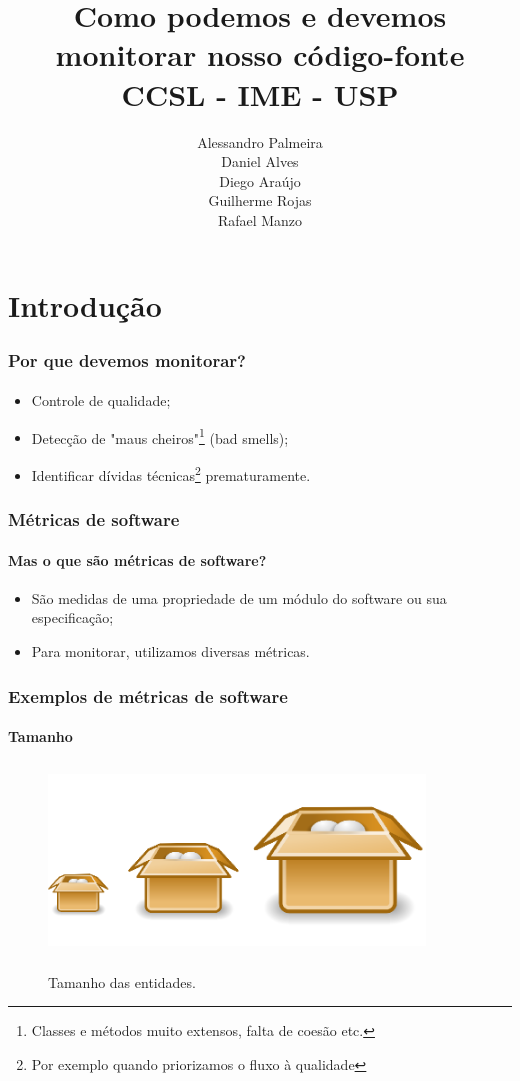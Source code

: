 \documentclass{beamer}
\title{
       \textbf{Como podemos e devemos monitorar nosso código-fonte} \\
       CCSL - IME - USP
      }
\author{
        Alessandro Palmeira \\
        Daniel Alves \\
        Diego Araújo \\
        Guilherme Rojas \\
        Rafael Manzo
       }
\begin{document}
\maketitle

\section{Introdução}

\begin{frame}
  \frametitle{Por que devemos monitorar?}
  \framesubtitle{}
  
  \begin{itemize}
    \item Controle de qualidade;
    \item Detecção de "maus cheiros"\footnote{Classes e métodos muito extensos, falta de coesão etc.} (bad smells);
    \item Identificar dívidas técnicas\footnote{Por exemplo quando priorizamos o fluxo à qualidade} prematuramente.
  \end{itemize}

\end{frame}

\begin{frame}
  \frametitle{Métricas de software}
  \framesubtitle{Mas o que são métricas de software?}
  
\begin{itemize}
  \item São medidas de uma propriedade de um módulo do software ou sua especificação;
  \item Para monitorar, utilizamos diversas métricas.  
\end{itemize}

\end{frame}

\begin{frame}
  \frametitle{Exemplos de métricas de software}
  \framesubtitle{Tamanho}

  \begin{figure}
    \begin{center}
      \includegraphics[width=10cm, height=5cm]{images/size.png}
      \label{fig: size}
      \caption{Tamanho das entidades.}
    \end{center}
  \end{figure}
\end{frame}
\end{document}
